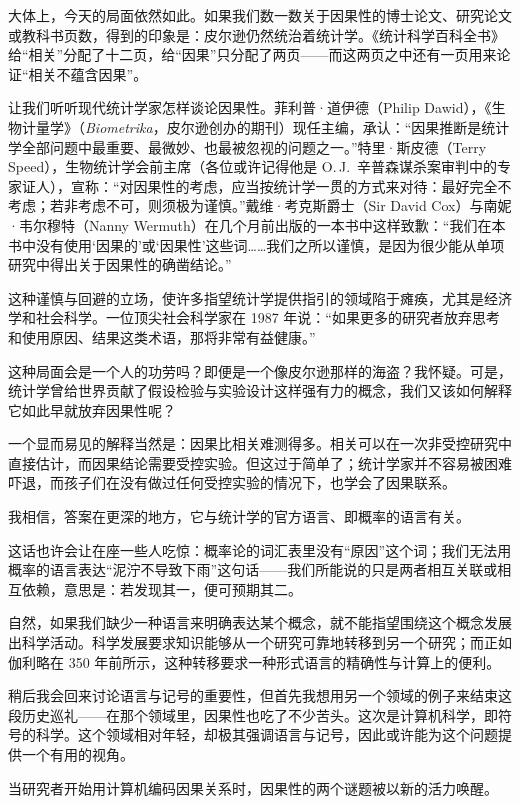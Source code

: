 大体上，今天的局面依然如此。如果我们数一数关于因果性的博士论文、研究论文或教科书页数，得到的印象是：皮尔逊仍然统治着统计学。《统计科学百科全书》给“相关”分配了十二页，给“因果”只分配了两页——而这两页之中还有一页用来论证“相关不蕴含因果”。

让我们听听现代统计学家怎样谈论因果性。菲利普·道伊德（Philip Dawid），《生物计量学》（\textit{Biometrika}，皮尔逊创办的期刊）现任主编，承认：“因果推断是统计学全部问题中最重要、最微妙、也最被忽视的问题之一。”特里·斯皮德（Terry Speed），生物统计学会前主席（各位或许记得他是 O.\,J.~辛普森谋杀案审判中的专家证人），宣称：“对因果性的考虑，应当按统计学一贯的方式来对待：最好完全不考虑；若非考虑不可，则须极为谨慎。”戴维·考克斯爵士（Sir David Cox）与南妮·韦尔穆特（Nanny Wermuth）在几个月前出版的一本书中这样致歉：“我们在本书中没有使用‘因果的’或‘因果性’这些词……我们之所以谨慎，是因为很少能从单项研究中得出关于因果性的确凿结论。”

这种谨慎与回避的立场，使许多指望统计学提供指引的领域陷于瘫痪，尤其是经济学和社会科学。一位顶尖社会科学家在 1987 年说：“如果更多的研究者放弃思考和使用原因、结果这类术语，那将非常有益健康。”

这种局面会是一个人的功劳吗？即便是一个像皮尔逊那样的海盗？我怀疑。可是，统计学曾给世界贡献了假设检验与实验设计这样强有力的概念，我们又该如何解释它如此早就放弃因果性呢？

一个显而易见的解释当然是：因果比相关难测得多。相关可以在一次非受控研究中直接估计，而因果结论需要受控实验。但这过于简单了；统计学家并不容易被困难吓退，而孩子们在没有做过任何受控实验的情况下，也学会了因果联系。

我相信，答案在更深的地方，它与统计学的官方语言、即概率的语言有关。

这话也许会让在座一些人吃惊：概率论的词汇表里没有“原因”这个词；我们无法用概率的语言表达“泥泞不导致下雨”这句话——我们所能说的只是两者相互关联或相互依赖，意思是：若发现其一，便可预期其二。

自然，如果我们缺少一种语言来明确表达某个概念，就不能指望围绕这个概念发展出科学活动。科学发展要求知识能够从一个研究可靠地转移到另一个研究；而正如伽利略在 350 年前所示，这种转移要求一种形式语言的精确性与计算上的便利。

稍后我会回来讨论语言与记号的重要性，但首先我想用另一个领域的例子来结束这段历史巡礼——在那个领域里，因果性也吃了不少苦头。这次是计算机科学，即符号的科学。这个领域相对年轻，却极其强调语言与记号，因此或许能为这个问题提供一个有用的视角。

当研究者开始用计算机编码因果关系时，因果性的两个谜题被以新的活力唤醒。

